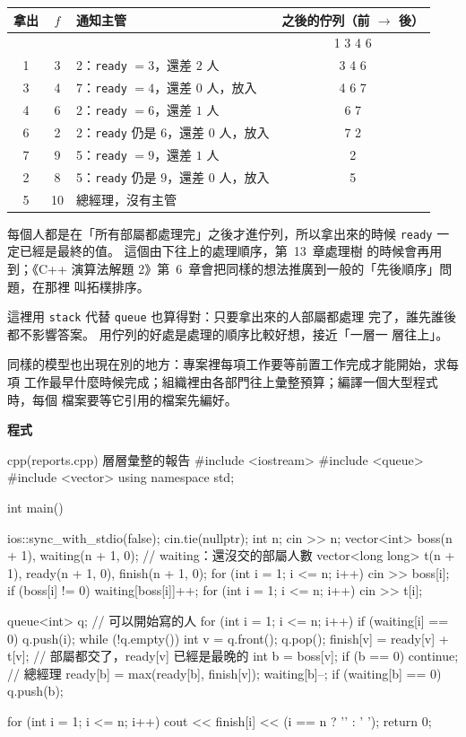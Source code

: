 \begin{center}
\begin{tabular}{cclc}
\toprule
拿出 & $f$ & 通知主管 & 之後的佇列（前 $\to$ 後） \\
\midrule
 & & & 1 3 4 6 \\
1 & 3 & 2：\texttt{ready} $= 3$，還差 $2$ 人 & 3 4 6 \\
3 & 4 & 7：\texttt{ready} $= 4$，還差 $0$ 人，放入 & 4 6 7 \\
4 & 6 & 2：\texttt{ready} $= 6$，還差 $1$ 人 & 6 7 \\
6 & 2 & 2：\texttt{ready} 仍是 $6$，還差 $0$ 人，放入 & 7 2 \\
7 & 9 & 5：\texttt{ready} $= 9$，還差 $1$ 人 & 2 \\
2 & 8 & 5：\texttt{ready} 仍是 $9$，還差 $0$ 人，放入 & 5 \\
5 & 10 & 總經理，沒有主管 & \\
\bottomrule
\end{tabular}
\end{center}

每個人都是在「所有部屬都處理完」之後才進佇列，所以拿出來的時候
\texttt{ready} 一定已經是最終的值。 這個由下往上的處理順序，第~13~章處理樹
的時候會再用到；《C++ 演算法解題 2》第~6~章會把同樣的想法推廣到一般的「先後順序」問題，在那裡
叫拓樸排序。

這裡用 \texttt{stack} 代替 \texttt{queue} 也算得對：只要拿出來的人部屬都處理
完了，誰先誰後都不影響答案。 用佇列的好處是處理的順序比較好想，接近「一層一
層往上」。

同樣的模型也出現在別的地方：專案裡每項工作要等前置工作完成才能開始，求每項
工作最早什麼時候完成；組織裡由各部門往上彙整預算；編譯一個大型程式時，每個
檔案要等它引用的檔案先編好。

\textbf{程式}

\begin{example}[label=ex:reports]{cpp}{(reports.cpp) 層層彙整的報告}
#include <iostream>
#include <queue>
#include <vector>
using namespace std;

int main() {
    ios::sync_with_stdio(false);
    cin.tie(nullptr);
    int n;
    cin >> n;
    vector<int> boss(n + 1), waiting(n + 1, 0);   // waiting：還沒交的部屬人數
    vector<long long> t(n + 1), ready(n + 1, 0), finish(n + 1, 0);
    for (int i = 1; i <= n; i++) {
        cin >> boss[i];
        if (boss[i] != 0) {
            waiting[boss[i]]++;
        }
    }
    for (int i = 1; i <= n; i++) {
        cin >> t[i];
    }

    queue<int> q;                         // 可以開始寫的人
    for (int i = 1; i <= n; i++) {
        if (waiting[i] == 0) {
            q.push(i);
        }
    }
    while (!q.empty()) {
        int v = q.front();
        q.pop();
        finish[v] = ready[v] + t[v];      // 部屬都交了，ready[v] 已經是最晚的
        int b = boss[v];
        if (b == 0) {
            continue;                     // 總經理
        }
        ready[b] = max(ready[b], finish[v]);
        waiting[b]--;
        if (waiting[b] == 0) {
            q.push(b);
        }
    }

    for (int i = 1; i <= n; i++) {
        cout << finish[i] << (i == n ? '\n' : ' ');
    }
    return 0;
}
\end{example}

